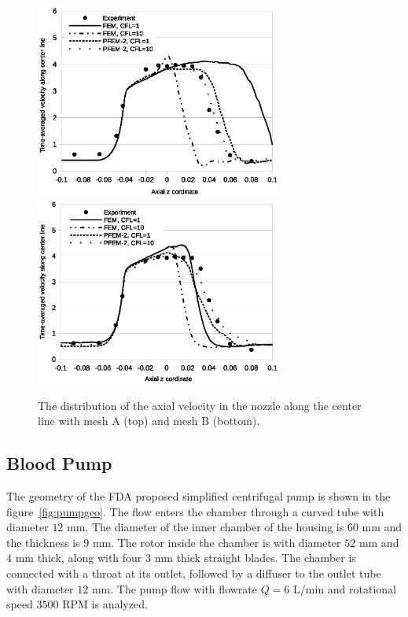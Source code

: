 \begin{figure}[htbp]
    \centering
    \includegraphics[width=3.2in]{imgs/nozzle_pump/nozzle_midvel_fm2.eps}
    \includegraphics[width=3.2in]{imgs/nozzle_pump/nozzle_midvel_pm2.eps}
    \caption{The distribution of the axial velocity in the nozzle along the center line with mesh A (top) and mesh B (bottom).
}
    \label{fig:nozzlemidvel}
\end{figure}

\subsection{Blood Pump}

The geometry of the FDA proposed simplified centrifugal pump is shown in the figure~\ref{fig:pumpgeo}. The flow enters the chamber through a curved tube with diameter $12$ mm. The diameter of the inner chamber of the housing is $60$ mm and the thickness is $9$ mm. The rotor inside the chamber is with diameter $52$ mm and $4$ mm thick, along with four $3$ mm thick straight blades. The chamber is connected with a throat at its outlet, followed by a diffuser to the outlet tube with diameter $12$ mm. The pump flow with flowrate $Q=6$ L/min and rotational speed $3500$ RPM is analyzed. 

